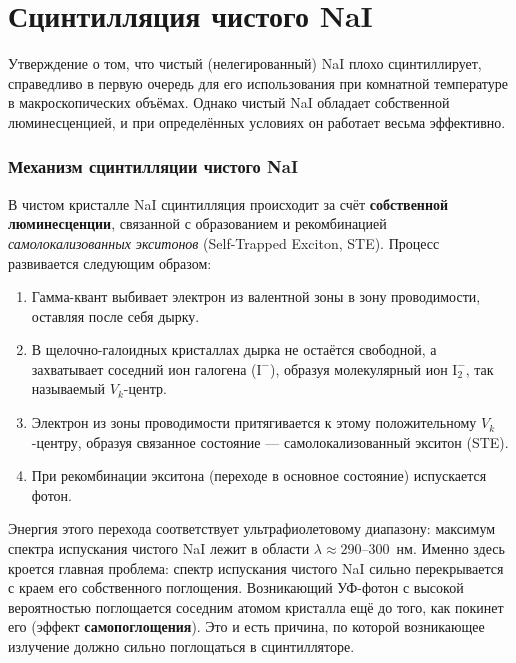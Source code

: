 \documentclass[12pt,a4paper]{article}
\begin{document}







\section*{Сцинтилляция чистого NaI}

Утверждение о том, что чистый (нелегированный) NaI плохо сцинтиллирует, справедливо в первую очередь для его использования при комнатной температуре в макроскопических объёмах. Однако чистый NaI обладает собственной люминесценцией, и при определённых условиях он работает весьма эффективно.

\subsubsection*{Механизм сцинтилляции чистого NaI}

В чистом кристалле NaI сцинтилляция происходит за счёт \textbf{собственной люминесценции}, связанной с образованием и рекомбинацией \textit{самолокализованных экситонов} (Self-Trapped Exciton, STE). Процесс развивается следующим образом:

\begin{enumerate}
    \item Гамма-квант выбивает электрон из валентной зоны в зону проводимости, оставляя после себя дырку.
    \item В щелочно-галоидных кристаллах дырка не остаётся свободной, а захватывает соседний ион галогена ($\text{I}^-$), образуя молекулярный ион $\text{I}_2^-$, так называемый $V_k$-центр.
    \item Электрон из зоны проводимости притягивается к этому положительному $V_k$-центру, образуя связанное состояние --- самолокализованный экситон (STE).
    \item При рекомбинации экситона (переходе в основное состояние) испускается фотон.
\end{enumerate}

Энергия этого перехода соответствует ультрафиолетовому диапазону: максимум спектра испускания чистого NaI лежит в области $\lambda \approx 290\text{--}300$~нм. Именно здесь кроется главная проблема: спектр испускания чистого NaI сильно перекрывается с краем его собственного поглощения. Возникающий УФ-фотон с высокой вероятностью поглощается соседним атомом кристалла ещё до того, как покинет его (эффект \textbf{самопоглощения}). Это и есть причина, по которой возникающее излучение должно сильно поглощаться в сцинтилляторе.
\end{document}
